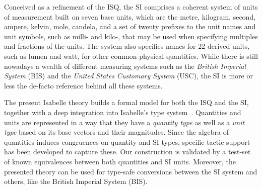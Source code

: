 \documentclass[11pt,a4paper]{book}
\begin{document}
Conceived as a refinement of the ISQ, the SI comprises a coherent system of units of measurement built on seven base
units, which are the metre, kilogram, second, ampere, kelvin, mole, candela, and a set of twenty prefixes to the unit
names and unit symbols, such as milli- and kilo-, that may be used when specifying multiples and fractions of the
units. The system also specifies names for 22 derived units, such as lumen and watt, for other common physical
quantities. While there is still nowadays a wealth of different measuring systems such as the \emph{British Imperial
  System} (BIS) and the \emph{United States Customary System} (USC), the SI is more or less the de-facto reference
behind all these systems.

The present Isabelle theory builds a formal model for both the ISQ and the SI, together with a deep integration into
Isabelle's type system~\cite{nipkow.ea:isabelle:2002}. Quantities and units are represented in a way that they have a
\emph{quantity type} as well as a \emph{unit type} based on its base vectors and their magnitudes. Since the algebra of
quantities induces congruences on quantity and SI types, specific tactic support has been developed to capture these.
Our construction is validated by a test-set of known equivalences between both quantities and SI units.  Moreover, the
presented theory can be used for type-safe conversions between the SI system and others, like the British Imperial
System (BIS).
\end{document}
